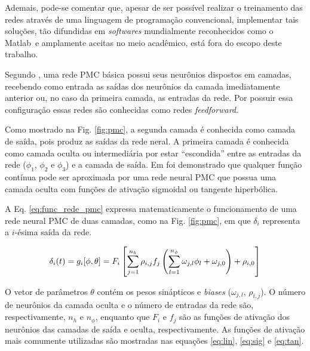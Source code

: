 Ademais, pode-se comentar que, apesar de ser possível realizar o treinamento das
redes através de uma linguagem de programação convencional, implementar tais
soluções, tão difundidas em {\it softwares} mundialmente reconhecidos como o
Matlab\reg\ e amplamente aceitas no meio acadêmico, está fora do escopo deste
trabalho.

Segundo , uma rede PMC básica possui seus neurônios
dispostos em camadas, recebendo como entrada as saídas dos neurônios da camada
imediatamente anterior ou, no caso da primeira camada, as entradas da rede. Por
possuir essa configuração essas redes são conhecidas como redes {\it
feedforward}.

Como mostrado na Fig. \ref{fig:pmc}, a segunda camada é conhecida como camada
de saída, pois produz as saídas da rede neral. A primeira camada é conhecida
como camada oculta ou intermediária por estar ``escondida'' entre as entradas da
rede ($\phi_1$, $\phi_2$ e $\phi_3$) e a camada de saída. Em
 foi demonstrado que qualquer função contínua pode ser
aproximada por uma rede neural PMC que possua uma camada oculta com funções de
ativação sigmoidal ou tangente hiperbólica.

A Eq. \ref{eq:func_rede_pmc} expressa matematicamente o funcionamento de uma
rede neural PMC de duas camadas, como na Fig. \ref{fig:pmc}, em que $\delta_i$
representa a $i$-ésima saída da rede.

\begin{equation}\label{eq:func_rede_pmc}
\delta_i(t) = g_i[\phi,\theta] =
              F_i\left[\sum_{j=1}^{n_h}\rho_{i,j}f_j
              \left(\sum_{l=1}^{n_\phi}\omega_{j,l}\phi_l+\omega_{j,0}\right)+
              \rho_{i,0}\right]
\end{equation}

O vetor de parâmetros $\theta$ contém os pesos sinápticos e {\it biases}
($\omega_{j,l}$, $\rho_{i,j}$). O número de neurônios da camada oculta e o
número de entradas da rede são, respectivamente, $n_h$ e $n_\phi$, enquanto que
$F_i$ e $f_j$ são as funções de ativação dos neurônios das camadas de saída e
oculta, respectivamente. As funções de ativação mais comumente utilizadas são
mostradas nas equações \ref{eq:lin}, \ref{eq:sig} e \ref{eq:tan}.

